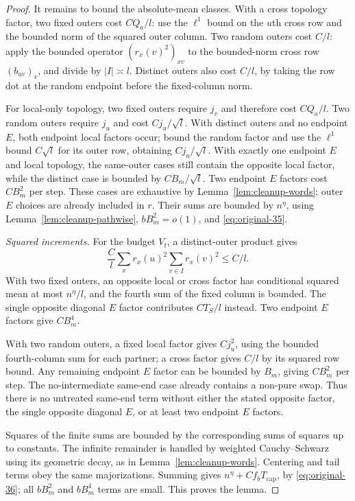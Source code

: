 \begin{proof}
It remains to bound the absolute-mean classes.  With a cross
topology factor, two fixed outers cost $CQ_a/l$: use the
$\ell^1$ bound on the $u$th cross row and the bounded norm of
the squared outer column.  Two random outers cost $C/l$: apply
the bounded operator $(r_x(v)^2)_{xv}$ to the bounded-norm cross
row $(b_{uv})_v$, and divide by $|I|\asymp l$.  Distinct outers
also cost $C/l$, by taking the row dot at the random endpoint
before the fixed-column norm.

For local-only topology, two fixed outers require $j_v$ and
therefore cost $CQ_a/l$.  Two random outers require $j_u$ and
cost $Cj_u/\sqrt l$.  With distinct outers and no endpoint $E$,
both endpoint local factors occur; bound the random factor and
use the $\ell^1$ bound $C\sqrt l$ for its outer row, obtaining
$Cj_u/\sqrt l$.  With exactly one endpoint $E$ and local
topology, the same-outer cases still contain the opposite local
factor, while the distinct case is bounded by $CB_m/\sqrt l$.
Two endpoint $E$ factors cost $CB_m^2$ per step.  These cases
are exhaustive by Lemma~\ref{lem:cleanup-words}; outer $E$
choices are already included in $r$.  Their sums are bounded by
$n^\eta$, using Lemma~\ref{lem:cleanup-pathwise},
$bB_m^2=o(1)$, and \eqref{eq:original-35}.

\emph{Squared increments.}
For the budget $V_t$, a distinct-outer product gives
\[
 \frac{C}{l}\sum_x r_x(u)^2
                         \sum_{v\in I}r_x(v)^2\leq C/l.
\]
With two fixed outers, an opposite local or cross factor has
conditional squared mean at most $n^\eta/l$, and the fourth
sum of the fixed column is bounded.  The single opposite
diagonal $E$ factor contributes $CT_S/l$ instead.  Two endpoint
$E$ factors give $CB_m^4$.

With two random outers, a fixed local factor gives $Cj_u^2$,
using the bounded fourth-column sum for each partner; a cross
factor gives $C/l$ by its squared row bound.  Any remaining
endpoint $E$ factor can be bounded by $B_m$, giving $CB_m^2$
per step.  The no-intermediate same-end case already contains a
non-pure swap.  Thus there is no untreated same-end term without
either the stated opposite factor, the single opposite diagonal
$E$, or at least two endpoint $E$ factors.

Squares of the finite sums are bounded by the corresponding
sums of squares up to constants.  The infinite remainder is
handled by weighted Cauchy--Schwarz using its geometric decay,
as in Lemma~\ref{lem:cleanup-words}.  Centering and tail terms
obey the same majorizations.  Summing gives
$n^\eta+Cf_bT_{\mathrm{cap}}$, by
\eqref{eq:original-36}; all $bB_m^2$ and $bB_m^4$ terms are
small.  This proves the lemma.
\end{proof}

